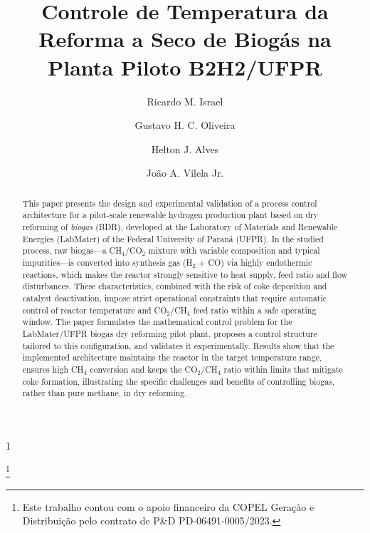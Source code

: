 \documentclass[a4paper]{ifacconf}
\def\portugues{1}
\def\portugues{0}
\begin{document}
\if\portugues1

\begin{frontmatter}

\title{Controle de Temperatura da Reforma a Seco de Biogás na Planta
Piloto B2H2/UFPR}

\thanks[footnoteinfo]{Este trabalho contou com o apoio financeiro da COPEL
Geração e Distribuição pelo contrato de P\&D PD-06491-0005/2023.}

\author[First]{Ricardo M. Israel}
\author[First]{Gustavo H. C. Oliveira}
\author[Second]{Helton J. Alves}
\author[First]{Jo\~ao A. Vilela Jr.}

\address[First]{Departamento de Engenharia Elétrica,
Universidade Federal do Paraná, Curitiba, PR, Brasil\\
(e-mail: \{ricardo.israel, gustavo.oliveira, vilela\}@ufpr.br)}
\address[Second]{Departamento de Engenharia Química,
Universidade Federal do Paraná, Curitiba, PR, Brasil\\
(e-mail: helton.alves@ufpr.br)}

\renewcommand{\abstractname}{{\bf Abstract:~}}

\begin{abstract}
This paper presents the design and experimental validation of a process
control architecture for a pilot-scale renewable hydrogen production plant
based on dry reforming of \emph{biogas} (BDR), developed at the Laboratory
of Materials and Renewable Energies (LabMater) of the Federal University of
Paraná (UFPR). In the studied process, raw biogas---a CH$_4$/CO$_2$ mixture
with variable composition and typical impurities---is converted into synthesis
gas (H$_2$ + CO) via highly endothermic reactions, which makes the reactor
strongly sensitive to heat supply, feed ratio and flow disturbances. These
characteristics, combined with the risk of coke deposition and catalyst
deactivation, impose strict operational constraints that require automatic
control of reactor temperature and CO$_2$/CH$_4$ feed ratio within a safe
operating window. The paper formulates the mathematical control problem for
the LabMater/UFPR biogas dry reforming pilot plant, proposes a control
structure tailored to this configuration, and validates it experimentally.
Results show that the implemented architecture maintains the reactor in the
target temperature range, ensures high CH$_4$ conversion and keeps the
CO$_2$/CH$_4$ ratio within limits that mitigate coke formation, illustrating
the specific challenges and benefits of controlling biogas, rather than pure
methane, in dry reforming.


\end{abstract}
\end{frontmatter}
\end{document}
